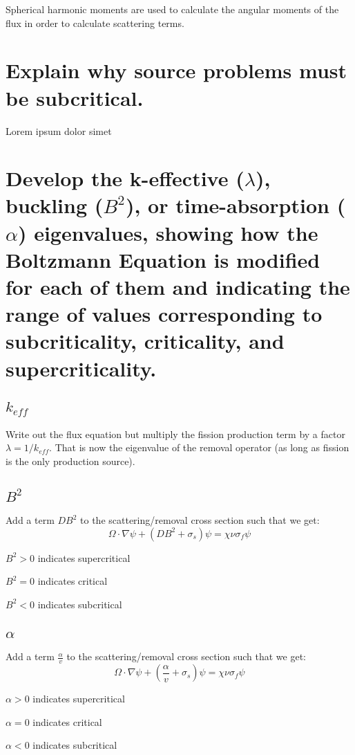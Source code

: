 \documentclass{article}
\begin{document}
Spherical harmonic moments are used to calculate the angular moments of the flux in order to calculate scattering terms.

\newpage
\section{Explain why source problems must be subcritical.}

Lorem ipsum dolor simet

\newpage
\section{Develop the k-effective ($\lambda$), buckling ($B^2$), or time-absorption ($\alpha$) eigenvalues, showing how the Boltzmann Equation is modified for each of them and indicating the range of values corresponding to subcriticality, criticality, and supercriticality.}

\subsection{$k_{eff}$}
Write out the flux equation but multiply the fission production term by a factor $\lambda = 1 / k_{eff}$. That is now the eigenvalue of the removal operator (as long as fission is the only production source).

\subsection{$B^2$}
Add a term $DB^2$ to the scattering/removal cross section such that we get:
$$
	\Omega \cdot \nabla \psi + (DB^2 + \sigma_s) \psi = \chi \nu \sigma_f \psi
$$

$B^2 > 0$ indicates supercritical

$B^2 = 0$ indicates critical

$B^2 < 0$ indicates subcritical

\subsection{$\alpha$}
Add a term $\frac{\alpha}{v}$ to the scattering/removal cross section such that we get:
$$
	\Omega \cdot \nabla \psi + (\frac{\alpha}{v} + \sigma_s) \psi = \chi \nu \sigma_f \psi
$$

$\alpha > 0$ indicates supercritical

$\alpha = 0$ indicates critical

$\alpha < 0$ indicates subcritical
\end{document}
